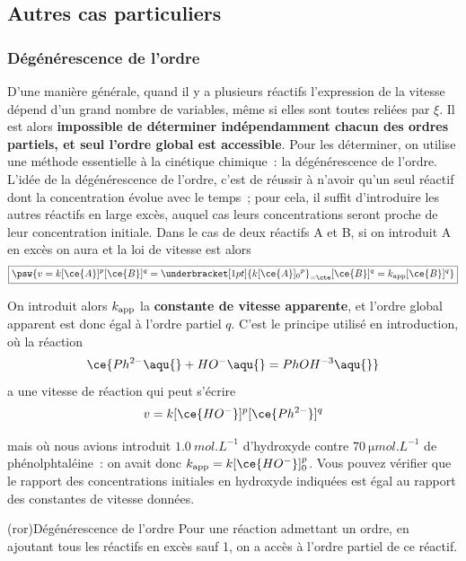 \documentclass[../../main/main.tex]{subfiles}
\begin{document}
\subsection{Autres cas particuliers}
\subsubsection{Dégénérescence de l'ordre}
D'une manière générale, quand il y a plusieurs réactifs l'expression de la
vitesse dépend d'un grand nombre de variables, même si elles sont toutes reliées
par $\xi$. Il est alors \textbf{impossible de déterminer indépendamment chacun
	des ordres partiels, et seul l'ordre global est accessible}. Pour les
déterminer, on utilise une méthode essentielle à la cinétique chimique~: la
dégénérescence de l'ordre.
\bigbreak
L'idée de la dégénérescence de l'ordre, c'est de réussir à n'avoir qu'un seul
réactif dont la concentration évolue avec le temps~; pour cela, il suffit
d'introduire les autres réactifs en large excès, auquel cas leurs concentrations
seront proche de leur concentration initiale. Dans le cas de deux réactifs A et
B, si on introduit A en excès on aura
\psw{
	\[[\ce{A}](t) \approx [\ce{A}]_0\]
}
et la loi de vitesse est alors
\[
	\boxed{
	\psw{
	v =
	k[\ce{A}]^{p}[\ce{B}]^{q} =
	\underbracket[1pt]{k[\ce{A}]_0{}^{p}}_{= \cte}[\ce{B}]^{q} =
	k_{\rm app}[\ce{B}]^{q}
	}
	}
\]

On introduit alors $k_{\rm app}$ la \textbf{constante de vitesse apparente}, et
l'ordre global apparent est donc égal à l'ordre partiel $q$. C'est le
principe utilisé en introduction, où la réaction
\[\ce{Ph^{2-}\aqu{} + HO^{-}\aqu{} = PhOH^{-3}\aqu{}}\]
a une vitesse de réaction qui peut s'écrire
\[v = k[\ce{HO^{-}}]^{p}[\ce{Ph^{2-}}]^{q}\]

mais où nous avions introduit $\SI{1.0}{mol.L^{-1}}$ d'hydroxyde contre
$\SI{70}{\micro mol.L^{-1}}$ de phénolphtaléine~: on avait donc $k_{\rm app} =
	k[\ce{HO^{-}}]_0^{p}$. Vous pouvez vérifier que le rapport des
concentrations initiales en hydroxyde indiquées est égal au rapport des
constantes de vitesse données.

\begin{tcb}[label=prop:dege, bld, cnt](ror){Dégénérescence de l'ordre}
	Pour une réaction admettant un ordre, en ajoutant tous les réactifs en excès
	sauf 1, on a accès à l'ordre partiel de ce réactif.
\end{tcb}
\end{document}

